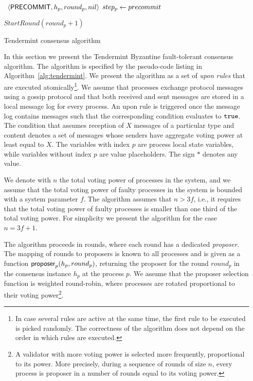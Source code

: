 \begin{algorithm}[htb!]
\begin{algorithmic}[1]
\SHORTSPACE {}
\label{line:tab:onTimeoutPrevote}  \STATE \Broadcast \
$\langle\mathsf{PRECOMMIT},h_p,round_p,nil\rangle$   \label{line:tab:precommit-nil-onTimeout}
\STATE $step_p \leftarrow precommit$ \ENDIF	\ENDFUNCTION

\SHORTSPACE {}
\label{line:tab:onTimeoutPrecommit} 
\STATE $StartRound(round_p + 1)$ \label{line:tab:nextRound} \ENDIF
\ENDFUNCTION	\end{algorithmic} \caption{Tendermint consensus algorithm}
\label{alg:tendermint} \end{algorithm}

In this section we present the Tendermint Byzantine fault-tolerant consensus
algorithm.  The algorithm is specified by the pseudo-code listing in
Algorithm~\ref{alg:tendermint}. We present the algorithm as a set of \emph{upon
rules} that are executed atomically\footnote{In case several rules are active
at the same time, the first rule to be executed is picked randomly. The
correctness of the algorithm does not depend on the order in which rules are
executed.}. We assume that processes exchange protocol messages using a gossip
protocol and that both received and sent messages are stored in a local message
log for every process. An upon rule is triggered once the message log contains
messages such that the corresponding condition evaluates to $\tt{true}$. The
condition that assumes reception of $X$ messages of a particular type and
content denotes a set of messages whose senders have aggregate voting power at
least equal to $X$. The variables with index $p$ are process local state
variables, while variables without index $p$ are value placeholders. The sign
$*$ denotes any value.    

We denote with $n$ the total voting power of processes in the system, and we
assume that the total voting power of faulty processes in the system is bounded
with a system parameter $f$.  The algorithm assumes that $n > 3f$, i.e., it
requires that the total voting power of faulty processes is smaller than one
third of the total voting power. For simplicity we present the algorithm for
the case $n = 3f + 1$.

The algorithm proceeds in rounds, where each round has a dedicated
\emph{proposer}. The mapping of rounds to proposers is known to all processes
and is given as a function $\mathsf{proposer}_p(h_p, round_p)$, returning the proposer for
the round $round_p$ in the consensus instance $h_p$ at the process $p$. We
assume that the proposer selection function is weighted round-robin, where
processes are rotated proportional to their voting power\footnote{A validator
with more voting power is selected more frequently, proportional to its power.
More precisely, during a sequence of rounds of size $n$, every process is
proposer in a number of rounds equal to its voting power.}. 


